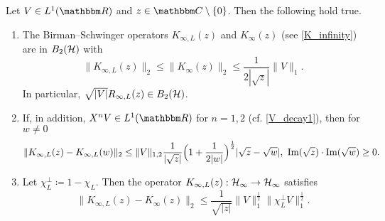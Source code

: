 \begin{lemma}\label{bso01t}
Let $V\in L^1(\R)$ and $z\in\C\setminus\{0\}$. Then the following hold true.
\begin{enumerate}
\item The Birman--Schwinger operators $K_{\infty,L}(z)$ and $K_\infty(z)$ (see \eqref{K_infinity}) are in $B_2({\mathcal H})$ with
\begin{equation}\label{bso01t01}
  \| K_{\infty,L}(z)\|_2 \leq \|K_\infty(z)\|_2 \leq \frac{1}{2|\sqrt{z}|}\|V\|_1 .
\end{equation}
In particular, $\sqrt{|V|}R_{\infty,L}(z)\in B_2({\mathcal H})$.
\item
If, in addition, $X^nV\in L^1(\R)$ for $n=1,2$ (cf. \eqref{V_decay1}), then for $w\neq 0$
\begin{equation}\label{bso01t01a}
  \|K_{\infty,L}(z) - K_{\infty,L}(w)\|_2
       \leq  \|V\|_{1,2} \frac{1}{|\sqrt{z}|}\Big( 1+\frac{1}{2|w|}\Big)^{\frac{1}{2}} |\sqrt{z}-\sqrt{w}|,\
  \operatorname{Im}(\sqrt{z})\cdot\operatorname{Im}(\sqrt{w})\geq 0 .
\end{equation}
\item
Let $\chi_L^\perp\coloneqq 1-\chi_L$. Then the operator $K_{\infty,L}(z):{\mathcal H}_\infty\to{\mathcal H}_\infty$ satisfies
\begin{equation}\label{bso01t02}
  \|K_{\infty,L}(z) - K_\infty(z)\|_2 \leq \frac{1}{\sqrt{|z|}} \|V\|_1^{\frac{1}{2}} \|\chi_L^\perp V\|_1^{\frac{1}{2}} .
\end{equation}
\end{enumerate}
\end{lemma}

